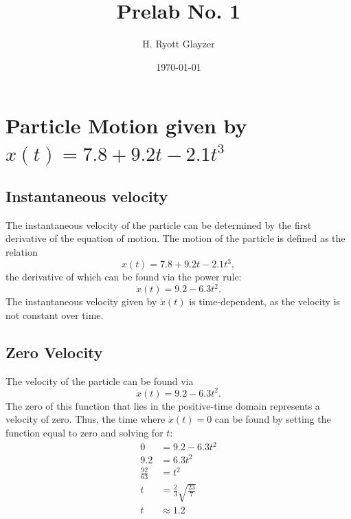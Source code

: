 \documentclass[11pt, letterpaper]{article}
\begin{document}


\title{Prelab No. 1}
\author{H. Ryott Glayzer}
\date{\today}


\maketitle



\section{Particle Motion given by $x(t) = 7.8 + 9.2t - 2.1t^{3}$}
\subsection{Instantaneous velocity}
The instantaneous velocity of the particle can be determined by the first derivative
of the equation of motion. 
The motion of the particle is defined as the relation
\begin{equation}
	x(t) = 7.8 + 9.2t - 2.1t^{3},
\end{equation}
the derivative of which can be found via the power rule:
\begin{equation}
	\dot{x}(t) = 9.2 - 6.3t^{2}.
\end{equation}
The instantaneous velocity given by $\dot{x}(t)$ is time-dependent, as the velocity
is not constant over time.

\subsection{Zero Velocity}
The velocity of the particle can be found via
\begin{equation}
	\dot{x}(t)=9.2-6.3t^{2}.
\end{equation}
The zero of this function that lies in the positive-time domain represents a
velocity of zero.
Thus, the time where $\dot{x}(t) = 0$ can be found by setting the function
equal to zero and solving for $t$:
\begin{equation}
\begin{align}
	0 &= 9.2-6.3t^{2}\\
	9.2 &= 6.3t^{2}\\
	\frac{92}{63} &= t^{2}\\
	t &= \frac{2}{3}\sqrt{\frac{23}{7}}\\
	t &\approx 1.2
\end{align}
\end{equation}
\end{document}
